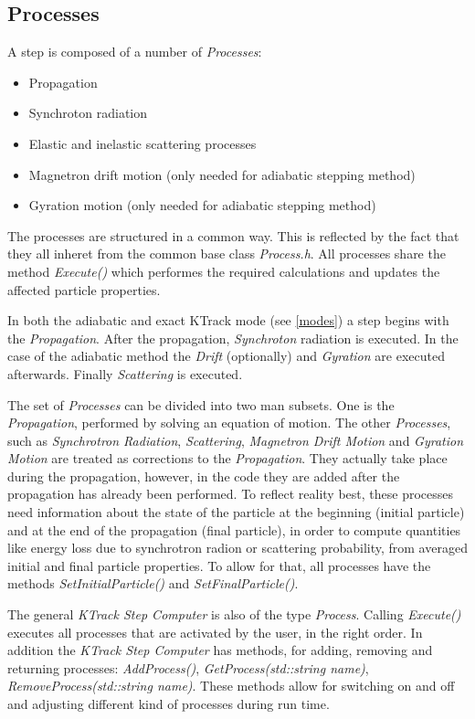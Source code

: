 \subsection{Processes}
\label{processes}
A step is composed of a number of \textit{Processes}:
\begin{itemize}
\label{listofprocesses}
    \item Propagation
    \item Synchroton radiation
    \item Elastic and inelastic scattering processes
    \item Magnetron drift motion (only needed for adiabatic stepping method)
    \item Gyration motion (only needed for adiabatic stepping method)
\end{itemize} 

The processes are structured in a common way. This is reflected by the fact that they all inheret from the common base class \textit{Process.h}. All processes share the method \textit{Execute()} which performes the required calculations and updates the affected particle properties.

In both the adiabatic and exact KTrack mode (see \ref{modes}) a step begins with the \textit{Propagation}. After the propagation, \textit{Synchroton} radiation is executed. In the case of the adiabatic method the \textit{Drift} (optionally) and \textit{Gyration} are executed afterwards. Finally \textit{Scattering} is executed. 

The set of \textit{Processes} can be divided into two man subsets. One is the \textit{Propagation}, performed by solving an equation of motion. The other \textit{Processes}, such as \textit{Synchrotron Radiation}, \textit{Scattering}, \textit{Magnetron Drift Motion} and \textit{Gyration Motion} are treated as corrections to the \textit{Propagation}.  They actually take place during the propagation, however, in the code they are added after the propagation has already been performed. To reflect reality best, these processes need information about the state of the particle at the beginning (initial particle) and at the end of the propagation (final particle), in order to compute quantities like energy loss due to synchrotron radion or scattering probability, from averaged initial and final particle properties. To allow for that, all processes have the methods \textit{SetInitialParticle()} and \textit{SetFinalParticle()}. 

The general \textit{KTrack Step Computer} is also of the type \textit{Process}. Calling \textit{Execute()} executes all processes that are activated by the user, in the right order. In addition the \textit{KTrack Step Computer} has methods, for adding, removing and returning processes: \textit{AddProcess()}, \textit{GetProcess(std::string name)}, \textit{RemoveProcess(std::string name)}. These methods allow for switching on and off and adjusting different kind of processes during run time.

